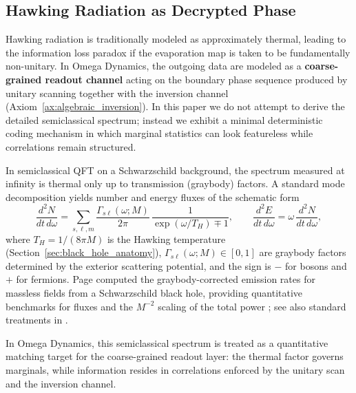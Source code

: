 \subsection{Hawking Radiation as Decrypted Phase}
Hawking radiation \cite{Hawking1975} is traditionally modeled as approximately thermal, leading to the information loss paradox if the evaporation map is taken to be fundamentally non-unitary.
In Omega Dynamics, the outgoing data are modeled as a \textbf{coarse-grained readout channel} acting on the boundary phase sequence produced by unitary scanning together with the inversion channel (Axiom~\ref{ax:algebraic_inversion}). In this paper we do not attempt to derive the detailed semiclassical spectrum; instead we exhibit a minimal deterministic coding mechanism in which marginal statistics can look featureless while correlations remain structured.

\begin{remark}
In semiclassical QFT on a Schwarzschild background, the spectrum measured at infinity is thermal only up to transmission (graybody) factors. A standard mode decomposition yields number and energy fluxes of the schematic form
\begin{equation}
  \frac{d^2N}{dt\,d\omega}
  =\sum_{s,\ell,m}\frac{\Gamma_{s\ell}(\omega;M)}{2\pi}\,
  \frac{1}{\exp(\omega/T_H)\mp 1},
  \qquad
  \frac{d^2E}{dt\,d\omega}=\omega\,\frac{d^2N}{dt\,d\omega},
\end{equation}
where $T_H=1/(8\pi M)$ is the Hawking temperature (Section~\ref{sec:black_hole_anatomy}), $\Gamma_{s\ell}(\omega;M)\in[0,1]$ are graybody factors determined by the exterior scattering potential, and the sign is $-$ for bosons and $+$ for fermions. Page computed the graybody-corrected emission rates for massless fields from a Schwarzschild black hole, providing quantitative benchmarks for fluxes and the $M^{-2}$ scaling of the total power \cite{Page1976Emission}; see also standard treatments in \cite{BirrellDavies1982,Wald1994}.
\par
In Omega Dynamics, this semiclassical spectrum is treated as a quantitative matching target for the coarse-grained readout layer: the thermal factor governs marginals, while information resides in correlations enforced by the unitary scan and the inversion channel.
\end{remark}

